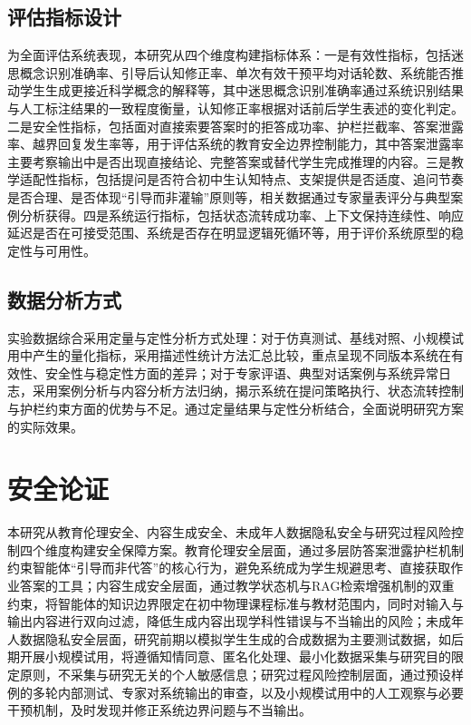 \subsection{评估指标设计}

为全面评估系统表现，本研究从四个维度构建指标体系：一是有效性指标，包括迷思概念识别准确率、引导后认知修正率、单次有效干预平均对话轮数、系统能否推动学生生成更接近科学概念的解释等，其中迷思概念识别准确率通过系统识别结果与人工标注结果的一致程度衡量，认知修正率根据对话前后学生表述的变化判定。二是安全性指标，包括面对直接索要答案时的拒答成功率、护栏拦截率、答案泄露率、越界回复发生率等，用于评估系统的教育安全边界控制能力，其中答案泄露率主要考察输出中是否出现直接结论、完整答案或替代学生完成推理的内容。三是教学适配性指标，包括提问是否符合初中生认知特点、支架提供是否适度、追问节奏是否合理、是否体现“引导而非灌输”原则等，相关数据通过专家量表评分与典型案例分析获得。四是系统运行指标，包括状态流转成功率、上下文保持连续性、响应延迟是否在可接受范围、系统是否存在明显逻辑死循环等，用于评价系统原型的稳定性与可用性。

\subsection{数据分析方式}

实验数据综合采用定量与定性分析方式处理：对于仿真测试、基线对照、小规模试用中产生的量化指标，采用描述性统计方法汇总比较，重点呈现不同版本系统在有效性、安全性与稳定性方面的差异；对于专家评语、典型对话案例与系统异常日志，采用案例分析与内容分析方法归纳，揭示系统在提问策略执行、状态流转控制与护栏约束方面的优势与不足。通过定量结果与定性分析结合，全面说明研究方案的实际效果。

\section{安全论证}

本研究从教育伦理安全、内容生成安全、未成年人数据隐私安全与研究过程风险控制四个维度构建安全保障方案。教育伦理安全层面，通过多层防答案泄露护栏机制约束智能体“引导而非代答”的核心行为，避免系统成为学生规避思考、直接获取作业答案的工具；内容生成安全层面，通过教学状态机与RAG检索增强机制的双重约束，将智能体的知识边界限定在初中物理课程标准与教材范围内，同时对输入与输出内容进行双向过滤，降低生成内容出现学科性错误与不当输出的风险；未成年人数据隐私安全层面，研究前期以模拟学生生成的合成数据为主要测试数据，如后期开展小规模试用，将遵循知情同意、匿名化处理、最小化数据采集与研究目的限定原则，不采集与研究无关的个人敏感信息；研究过程风险控制层面，通过预设样例的多轮内部测试、专家对系统输出的审查，以及小规模试用中的人工观察与必要干预机制，及时发现并修正系统边界问题与不当输出。

